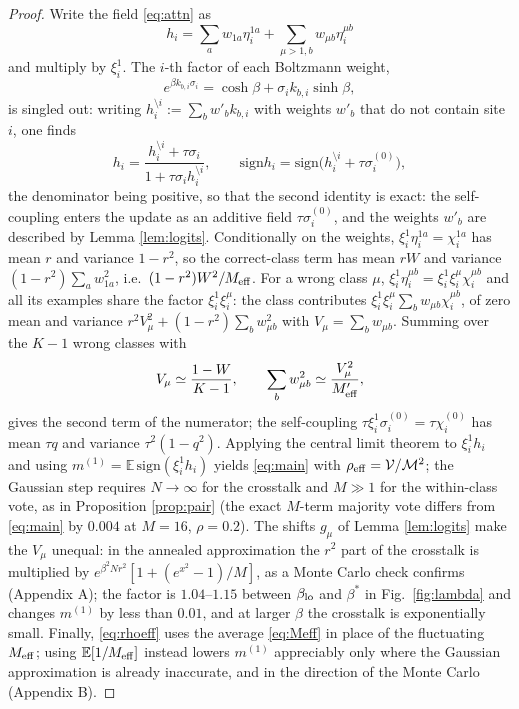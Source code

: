 \documentclass[11pt,a4paper]{article}
\newcommand{\E}{\mathbb{E}}
\newcommand{\Meff}{M_{\rm eff}}
\newcommand{\sgn}{\mathrm{sign}}
\begin{document}
\begin{proof}
Write the field \eqref{eq:attn} as
\begin{equation*}
h_i=\sum_aw_{1a}\eta^{1a}_i+\sum_{\mu>1,b}w_{\mu b}\eta^{\mu b}_i
\end{equation*}
and multiply by $\xi^1_i$. The $i$-th factor of each Boltzmann weight,
\begin{equation*}
e^{\beta k_{b,i}\sigma_i}=\cosh\beta+\sigma_ik_{b,i}\sinh\beta,
\end{equation*}
is singled out: writing $h^{\setminus i}_i:=\sum_bw'_bk_{b,i}$ with weights $w'_b$ that do not contain site $i$, one finds
\begin{equation*}
h_i=\frac{h^{\setminus i}_i+\tau\sigma_i}{1+\tau\sigma_ih^{\setminus i}_i},\qquad \sgn h_i=\sgn\big(h^{\setminus i}_i+\tau\sigma^{(0)}_i\big),
\end{equation*}
the denominator being positive, so that the second identity is exact: the self-coupling enters the update as an additive field $\tau\sigma^{(0)}_i$, and the weights $w'_b$ are described by Lemma \ref{lem:logits}. Conditionally on the weights, $\xi^1_i\eta^{1a}_i=\chi^{1a}_i$ has mean $r$ and variance $1-r^2$, so the correct-class term has mean $rW$ and variance $(1-r^2)\sum_aw_{1a}^2$, i.e.\ $(1-r^2)W^2/\Meff$. For a wrong class $\mu$, $\xi^1_i\eta^{\mu b}_i=\xi^1_i\xi^\mu_i\chi^{\mu b}_i$ and all its examples share the factor $\xi^1_i\xi^\mu_i$: the class contributes $\xi^1_i\xi^\mu_i\sum_bw_{\mu b}\chi^{\mu b}_i$, of zero mean and variance $r^2V_\mu^2+(1-r^2)\sum_bw_{\mu b}^2$ with $V_\mu=\sum_bw_{\mu b}$. Summing over the $K-1$ wrong classes with
\begin{equation*}
V_\mu\simeq\frac{1-W}{K-1},\qquad \sum_bw_{\mu b}^2\simeq\frac{V_\mu^2}{\Meff'},
\end{equation*}
gives the second term of the numerator; the self-coupling $\tau\xi^1_i\sigma^{(0)}_i=\tau\chi^{(0)}_i$ has mean $\tau q$ and variance $\tau^2(1-q^2)$. Applying the central limit theorem to $\xi^1_ih_i$ and using $m^{(1)}=\E\,\sgn(\xi^1_ih_i)$ yields \eqref{eq:main} with $\rho_{\rm eff}=\mathcal V/\mathcal M^2$; the Gaussian step requires $N\to\infty$ for the crosstalk and $M\gg1$ for the within-class vote, as in Proposition \ref{prop:pair} (the exact $M$-term majority vote differs from \eqref{eq:main} by $0.004$ at $M=16$, $\rho=0.2$). The shifts $g_\mu$ of Lemma \ref{lem:logits} make the $V_\mu$ unequal: in the annealed approximation the $r^2$ part of the crosstalk is multiplied by $e^{\beta^2Nr^2}[1+(e^{x^2}-1)/M]$, as a Monte Carlo check confirms (Appendix A); the factor is $1.04$--$1.15$ between $\beta_{\rm lo}$ and $\beta^*$ in Fig.\ \ref{fig:lambda} and changes $m^{(1)}$ by less than $0.01$, and at larger $\beta$ the crosstalk is exponentially small. Finally, \eqref{eq:rhoeff} uses the average \eqref{eq:Meff} in place of the fluctuating $\Meff$; using $\E[1/\Meff]$ instead lowers $m^{(1)}$ appreciably only where the Gaussian approximation is already inaccurate, and in the direction of the Monte Carlo (Appendix B).
\end{proof}
\end{document}

